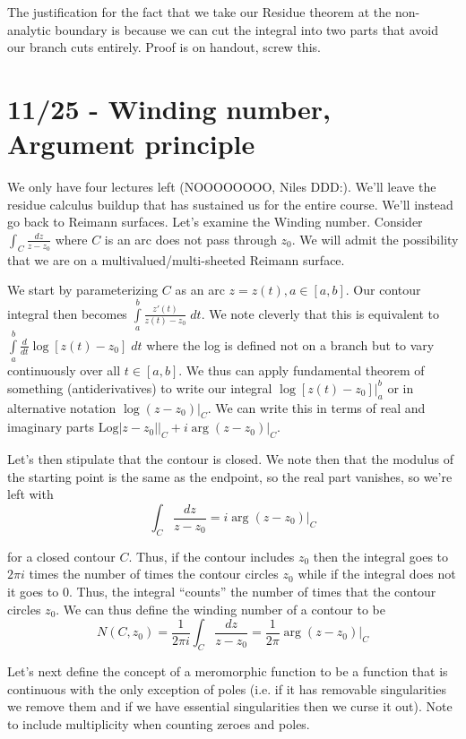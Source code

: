 \documentclass[10pt]{report}
\newcommand{\rd}[2]{\frac{d#1}{d#2}}
\newcommand{\abs}[1]{\left|#1\right|}
\newcommand{\Log}[0]{\mathrm{Log} }
\begin{document}
The justification for the fact that we take our Residue theorem at the non-analytic boundary is because we can cut the integral into two parts that avoid our branch cuts entirely. Proof is on handout, screw this.

\chapter{11/25 - Winding number, Argument principle}

We only have four lectures left (NOOOOOOOO, Niles DDD:). We'll leave the residue calculus buildup that has sustained us for the entire course. We'll instead go back to Reimann surfaces. Let's examine the Winding number. Consider $\int_{C}\frac{dz}{z-z_0}$ where $C$ is an arc does not pass through $z_0$. We will admit the possibility that we are on a multivalued/multi-sheeted Reimann surface.

We start by parameterizing $C$ as an arc $z=z(t), a \in [a,b]$. Our contour integral then becomes $\displaystyle\int\limits_{a}^{b}\frac{z'(t)}{z(t) - z_0}\;dt$. We note cleverly that this is equivalent to $\displaystyle\int\limits_{a}^{b}\rd{}{t}\log \left[ z(t) - z_0 \right]\;dt$ where the log is defined not on a branch but to vary continuously over all $t \in [a,b]$. We thus can apply fundamental theorem of something (antiderivatives) to write our integral $\log \left[ z(t) - z_0 \right]\Big|_a^b$ or in alternative notation $\log(z-z_0)\Big|_C$. We can write this in terms of real and imaginary parts $\Log\abs{z-z_0}\Big|_C + i\arg(z-z_0)\Big|_C$.

Let's then stipulate that the contour is closed. We note then that the modulus of the starting point is the same as the endpoint, so the real part vanishes, so we're left with
$$\int_C \frac{dz}{z-z_0} = i\arg(z-z_0)\Big|_C$$

for a closed contour $C$. Thus, if the contour includes $z_0$ then the integral goes to $2\pi i$ times the number of times the contour circles $z_0$ while if the integral does not it goes to $0$. Thus, the integral ``counts'' the number of times that the contour circles $z_0$. We can thus define the winding number of a contour to be
$$N(C,z_0) = \frac{1}{2\pi i}\int_C \frac{dz}{z-z_0} = \frac{1}{2\pi}\arg (z-z_0)\Big|_C$$

Let's next define the concept of a meromorphic function to be a function that is continuous with the only exception of poles (i.e. if it has removable singularities we remove them and if we have essential singularities then we curse it out). Note to include multiplicity when counting zeroes and poles. 
\end{document}

